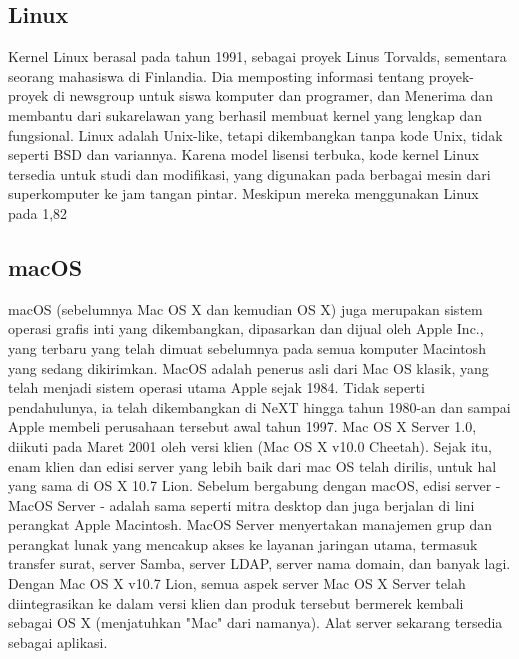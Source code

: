 \subsection{Linux}
	\begin{enumerate}
		Kernel Linux berasal pada tahun 1991, sebagai proyek Linus Torvalds, sementara seorang mahasiswa di Finlandia. Dia memposting informasi tentang proyek-proyek di newsgroup untuk siswa komputer dan programer, dan Menerima dan membantu dari sukarelawan yang berhasil membuat kernel yang lengkap dan fungsional. Linux adalah Unix-like, tetapi dikembangkan tanpa kode Unix, tidak seperti BSD dan variannya. Karena model lisensi terbuka, kode kernel Linux tersedia untuk studi dan modifikasi, yang digunakan pada berbagai mesin dari superkomputer ke jam tangan pintar. Meskipun mereka menggunakan Linux pada 1,82%
	\end{enumerate}
\subsection{macOS}
	\begin{enumerate}
		macOS (sebelumnya Mac OS X dan kemudian OS X) juga merupakan sistem operasi grafis inti yang dikembangkan, dipasarkan dan dijual oleh Apple Inc., yang terbaru yang telah dimuat sebelumnya pada semua komputer Macintosh yang sedang dikirimkan. MacOS adalah penerus asli dari Mac OS klasik, yang telah menjadi sistem operasi utama Apple sejak 1984. Tidak seperti pendahulunya, ia telah dikembangkan di NeXT hingga tahun 1980-an dan sampai Apple membeli perusahaan tersebut awal tahun 1997. Mac OS X Server 1.0, diikuti pada Maret 2001 oleh versi klien (Mac OS X v10.0 Cheetah). Sejak itu, enam klien dan edisi server yang lebih baik dari mac OS telah dirilis, untuk hal yang sama di OS X 10.7 Lion. Sebelum bergabung dengan macOS, edisi server - MacOS Server - adalah sama seperti mitra desktop dan juga berjalan di lini perangkat Apple Macintosh. MacOS Server menyertakan manajemen grup dan perangkat lunak yang mencakup akses ke layanan jaringan utama, termasuk transfer surat, server Samba, server LDAP, server nama domain, dan banyak lagi. Dengan Mac OS X v10.7 Lion, semua aspek server Mac OS X Server telah diintegrasikan ke dalam versi klien dan produk tersebut bermerek kembali sebagai OS X (menjatuhkan "Mac" dari namanya). Alat server sekarang tersedia sebagai aplikasi.
	\end{enumerate}

